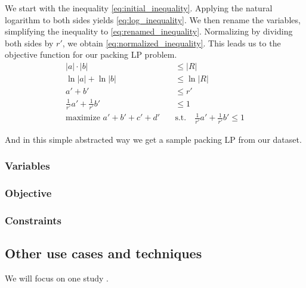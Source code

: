 We start with the inequality \ref{eq:initial_inequality}. Applying the natural logarithm to both sides yields \ref{eq:log_inequality}. We then rename the variables, simplifying the inequality to \ref{eq:renamed_inequality}.
Normalizing by dividing both sides by \(r'\), we obtain \ref{eq:normalized_inequality}. This leads us to the objective function for our packing LP problem.
\begin{align}
    |a| \cdot |b|                            & \leq |R| \label{eq:initial_inequality}                                                   \\
    \ln|a| + \ln|b|                          & \leq \ln|R| \label{eq:log_inequality}                                                    \\
    a' + b'                                  & \leq r' \label{eq:renamed_inequality}                                                    \\
    \frac{1}{r'} a' + \frac{1}{r'} b'        & \leq 1 \label{eq:normalized_inequality}                                                  \\
    \text{maximize } a' + b' + c' + d' \quad & \text{s.t.} \quad \frac{1}{r'} a' + \frac{1}{r'} b' \leq 1 \label{eq:objective_function}
\end{align}

And in this simple abstracted way we get a sample packing LP from our dataset.
\subsubsection{Variables}
\subsubsection{Objective}
\subsubsection{Constraints}


\subsection{Other use cases and techniques}
We will focus on one study \parencite{huangfu2015novel}.

